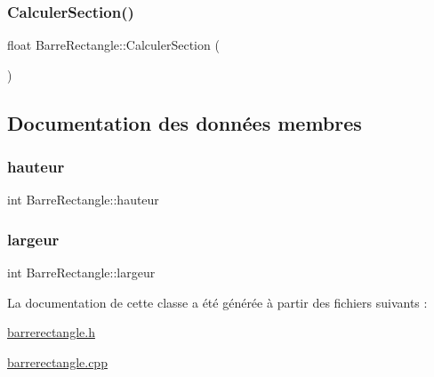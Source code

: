 \mbox{\label{class_barre_rectangle_aca359a79b9e74a94867ccaa4341f51ae}} 
\subsubsection{\texorpdfstring{Calculer\+Section()}{CalculerSection()}}
{\footnotesize\ttfamily float Barre\+Rectangle\+::\+Calculer\+Section (\begin{DoxyParamCaption}{ }\end{DoxyParamCaption})}



\subsection{Documentation des données membres}
\mbox{\label{class_barre_rectangle_a784fbd74278ac6f35b8e2e90a1c6f0a6}} 
\subsubsection{\texorpdfstring{hauteur}{hauteur}}
{\footnotesize\ttfamily int Barre\+Rectangle\+::hauteur\hspace{0.3cm}{\ttfamily [private]}}

\mbox{\label{class_barre_rectangle_a6805bad77d9cbdf787a911e0841d6d35}} 
\subsubsection{\texorpdfstring{largeur}{largeur}}
{\footnotesize\ttfamily int Barre\+Rectangle\+::largeur\hspace{0.3cm}{\ttfamily [private]}}



La documentation de cette classe a été générée à partir des fichiers suivants \+:\begin{DoxyCompactItemize}
\item 
\hyperlink{barrerectangle_8h}{barrerectangle.\+h}\item 
\hyperlink{barrerectangle_8cpp}{barrerectangle.\+cpp}\end{DoxyCompactItemize}
